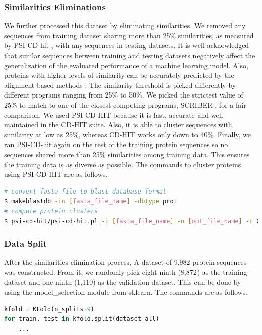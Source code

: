 \subsubsection{Similarities Eliminations}
We further processed this dataset by eliminating similarities. We removed any sequences from training dataset sharing more than 25\% similarities, as measured by PSI-CD-hit \cite{li2006cd,fu2012cd}, with any sequences in testing datasets. It is well acknowledged that similar sequences between training and testing datasets negatively affect the generalization of the evaluated performance of a machine learning model. Also, proteins with higher levels of similarity can be accurately predicted by the alignment-based methods \cite{zhang2018review}. The similarity threshold is picked differently by different programs ranging from 25\% to 50\%. We picked the strictest value of 25\% to match to one of the closest competing programs, SCRIBER \cite{zhang2019scriber}, for a fair comparison. We used PSI-CD-HIT because it is fast, accurate and well maintained in the CD-HIT suite. Also, it is able to cluster sequences with similarity at low as 25\%, whereas CD-HIT works only down to 40\%. Finally, we ran PSI-CD-hit again on the rest of the training protein sequences so no sequences shared more than 25\% similarities among training data. This ensures the training data is as diverse as possible. The commands to cluster proteins using PSI-CD-HIT are as follows.
\begin{lstlisting}[language=bash,frame=single]
# convert fasta file to blast database format
$ makeblastdb -in [fasta_file_name] -dbtype prot
# compute protein clusters
$ psi-cd-hit/psi-cd-hit.pl -i [fasta_file_name] -o [out_file_name] -c 0.25
\end{lstlisting}
\subsubsection{Data Split}
After the similarities elimination process, A dataset of 9,982 protein sequences was constructed. From it, we randomly pick eight ninth (8,872) as the training dataset and one ninth (1,110) as the validation dataset. This can be done by using the model\_selection module from sklearn. The commands are as follows.
\begin{lstlisting}[language=python,frame=single]
kfold = KFold(n_splits=9)
for train, test in kfold.split(dataset_all)
    ...
\end{lstlisting}


